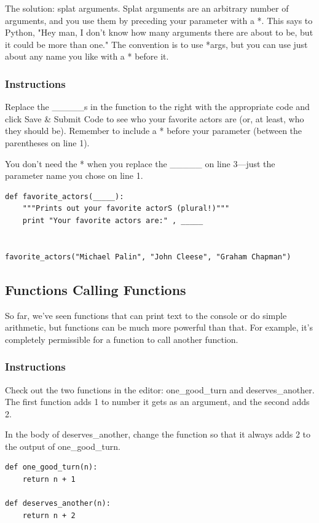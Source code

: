 \documentclass[12pt,a4paper,final,twoside,onecolumn,titlepage]{book}
\begin{document}
The solution: splat arguments. Splat arguments are an arbitrary number of arguments, and you use them by preceding your parameter with a *. This says to Python, "Hey man, I don't know how many arguments there are about to be, but it could be more than one." The convention is to use *args, but you can use just about any name you like with a * before it.
\subsubsection{Instructions}

Replace the \_\_\_\_\_s in the function to the right with the appropriate code and click Save \& Submit Code to see who your favorite actors are (or, at least, who they should be). Remember to include a * before your parameter (between the parentheses on line 1).

You don't need the * when you replace the \_\_\_\_\_ on line 3—just the parameter name you chose on line 1.

\begin{lstlisting}
def favorite_actors(_____):
    """Prints out your favorite actorS (plural!)"""
    print "Your favorite actors are:" , _____
    
    
favorite_actors("Michael Palin", "John Cleese", "Graham Chapman")
\end{lstlisting}

\subsection{Functions Calling Functions}

So far, we've seen functions that can print text to the console or do simple arithmetic, but functions can be much more powerful than that. For example, it's completely permissible for a function to call another function.
\subsubsection{Instructions}

Check out the two functions in the editor: one\_good\_turn and deserves\_another. The first function adds 1 to number it gets as an argument, and the second adds 2.

In the body of deserves\_another, change the function so that it always adds 2 to the output of one\_good\_turn.

\begin{lstlisting}
def one_good_turn(n):
    return n + 1
    
def deserves_another(n):
    return n + 2
\end{lstlisting}
\end{document}
